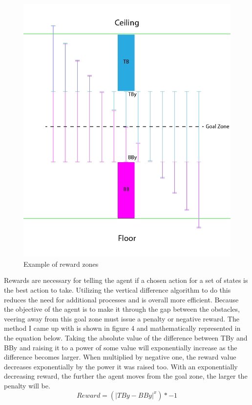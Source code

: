 \documentclass{article}
\begin{document}
\begin{figure}[h!]
    \centering
    \includegraphics[width=1\textwidth]{figure4}
    \caption{Example of reward zones}
    \label{fig:mesh2}
\end{figure}

Rewards are necessary for telling the agent if a chosen action for a set of states is the best action to take. Utilizing the vertical difference algorithm to do this reduces the need for additional processes and is overall more efficient. Because the objective of the agent is to make it through the gap between the obstacles, veering away from this goal zone must issue a penalty or negative reward. The method I came up with is shown in figure 4 and mathematically represented in the equation below. Taking the absolute value of the difference between TBy and BBy and raising it to a power of some value will exponentially increase as the difference becomes larger. When multiplied by negative one, the reward value decreases exponentially by the power it was raised too. With an exponentially decreasing reward, the further the agent moves from the goal zone, the larger the penalty will be.
\begin{equation}
Reward = (|TBy-BBy|^{x}) * -1
\end{equation}
\end{document}
